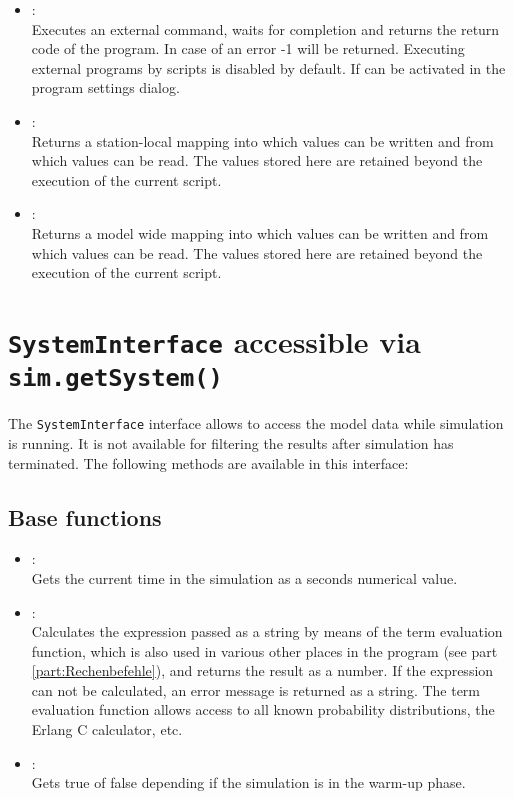 \begin{itemize}
\item
{}:\\
Executes an external command, waits for completion and returns the return code of the program.
In case of an error -1 will be returned.
Executing external programs by scripts is disabled by default. If can be activated
in the program settings dialog.

\item
{}:\\
Returns a station-local mapping into which values can be written and from which values can be read.
The values stored here are retained beyond the execution of the current script.  

\item
{}:\\
Returns a model wide mapping into which values can be written and from which values can be read.
The values stored here are retained beyond the execution of the current script.

\end{itemize}



\chapter{\texttt{SystemInterface} accessible via \texttt{sim.getSystem()}}

The \texttt{SystemInterface} interface allows to access the model data while simulation is running.
It is not available for filtering the results after simulation has terminated.
The following methods are available in this interface:

\section{Base functions}

\begin{itemize}

\item
{}:\\
Gets the current time in the simulation as a seconds numerical value.
  
\item
{}:\\
Calculates the expression passed as a string by means of the term evaluation function,
which is also used in various other places in the program (see part \ref{part:Rechenbefehle}), and returns the result as a  number.
If the expression can not be calculated, an error message is returned as a string.
The term evaluation function allows access to all known probability distributions,
the Erlang C calculator, etc.
  
\item
{}:\\
Gets true of false depending if the simulation is in the warm-up phase.
	
\end{itemize}


